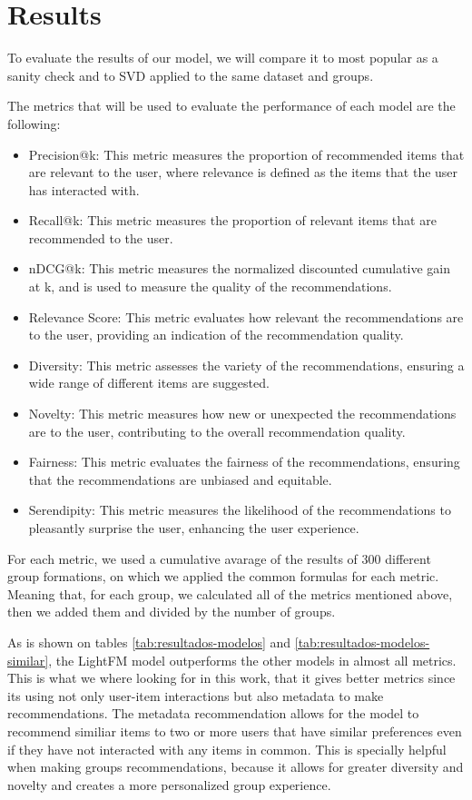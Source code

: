 \documentclass{article}
\begin{document}
\section{Results}

To evaluate the results of our model, we will compare it to most popular as a sanity check and to SVD applied to the same dataset and groups. %

The metrics that will be used to evaluate the performance of each model are the following:

\begin{itemize}
    \item Precision@k: This metric measures the proportion of recommended items that are relevant to the user, where relevance is defined as the items that the user has interacted with.
    \item Recall@k: This metric measures the proportion of relevant items that are recommended to the user.
    \item nDCG@k: This metric measures the normalized discounted cumulative gain at k, and is used to measure the quality of the recommendations.
    \item Relevance Score: This metric evaluates how relevant the recommendations are to the user, providing an indication of the recommendation quality.
    \item Diversity: This metric assesses the variety of the recommendations, ensuring a wide range of different items are suggested.
    \item Novelty: This metric measures how new or unexpected the recommendations are to the user, contributing to the overall recommendation quality.
    \item Fairness: This metric evaluates the fairness of the recommendations, ensuring that the recommendations are unbiased and equitable.
    \item Serendipity: This metric measures the likelihood of the recommendations to pleasantly surprise the user, enhancing the user experience.
\end{itemize}

For each metric, we used a cumulative avarage of the results of 300 different group formations, on which we applied the common formulas for each metric. Meaning that, for each group, we calculated all of the metrics mentioned above, then we added them and divided by the number of groups.

As is shown on tables \ref{tab:resultados-modelos} and \ref{tab:resultados-modelos-similar}, the LightFM model outperforms the other models in almost all metrics. This is what we where looking for in this work, that it gives better metrics since its using not only user-item interactions but also metadata to make recommendations. 
The metadata recommendation allows for the model to recommend similiar items to two or more users that have similar preferences even if they have not interacted with any items in common. This is specially helpful when 
making groups recommendations, because it allows for greater diversity and novelty and creates a more personalized group experience.
\end{document}
